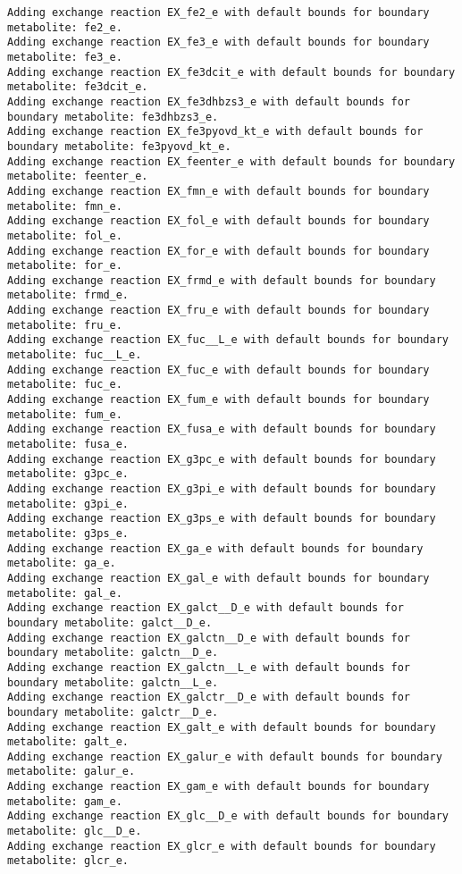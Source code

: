 \documentclass[
  letterpaper,
  DIV=11,
  numbers=noendperiod]{scrartcl}
\begin{document}
\begin{verbatim}
Adding exchange reaction EX_fe2_e with default bounds for boundary metabolite: fe2_e.
Adding exchange reaction EX_fe3_e with default bounds for boundary metabolite: fe3_e.
Adding exchange reaction EX_fe3dcit_e with default bounds for boundary metabolite: fe3dcit_e.
Adding exchange reaction EX_fe3dhbzs3_e with default bounds for boundary metabolite: fe3dhbzs3_e.
Adding exchange reaction EX_fe3pyovd_kt_e with default bounds for boundary metabolite: fe3pyovd_kt_e.
Adding exchange reaction EX_feenter_e with default bounds for boundary metabolite: feenter_e.
Adding exchange reaction EX_fmn_e with default bounds for boundary metabolite: fmn_e.
Adding exchange reaction EX_fol_e with default bounds for boundary metabolite: fol_e.
Adding exchange reaction EX_for_e with default bounds for boundary metabolite: for_e.
Adding exchange reaction EX_frmd_e with default bounds for boundary metabolite: frmd_e.
Adding exchange reaction EX_fru_e with default bounds for boundary metabolite: fru_e.
Adding exchange reaction EX_fuc__L_e with default bounds for boundary metabolite: fuc__L_e.
Adding exchange reaction EX_fuc_e with default bounds for boundary metabolite: fuc_e.
Adding exchange reaction EX_fum_e with default bounds for boundary metabolite: fum_e.
Adding exchange reaction EX_fusa_e with default bounds for boundary metabolite: fusa_e.
Adding exchange reaction EX_g3pc_e with default bounds for boundary metabolite: g3pc_e.
Adding exchange reaction EX_g3pi_e with default bounds for boundary metabolite: g3pi_e.
Adding exchange reaction EX_g3ps_e with default bounds for boundary metabolite: g3ps_e.
Adding exchange reaction EX_ga_e with default bounds for boundary metabolite: ga_e.
Adding exchange reaction EX_gal_e with default bounds for boundary metabolite: gal_e.
Adding exchange reaction EX_galct__D_e with default bounds for boundary metabolite: galct__D_e.
Adding exchange reaction EX_galctn__D_e with default bounds for boundary metabolite: galctn__D_e.
Adding exchange reaction EX_galctn__L_e with default bounds for boundary metabolite: galctn__L_e.
Adding exchange reaction EX_galctr__D_e with default bounds for boundary metabolite: galctr__D_e.
Adding exchange reaction EX_galt_e with default bounds for boundary metabolite: galt_e.
Adding exchange reaction EX_galur_e with default bounds for boundary metabolite: galur_e.
Adding exchange reaction EX_gam_e with default bounds for boundary metabolite: gam_e.
Adding exchange reaction EX_glc__D_e with default bounds for boundary metabolite: glc__D_e.
Adding exchange reaction EX_glcr_e with default bounds for boundary metabolite: glcr_e.

\end{verbatim}
\end{document}
